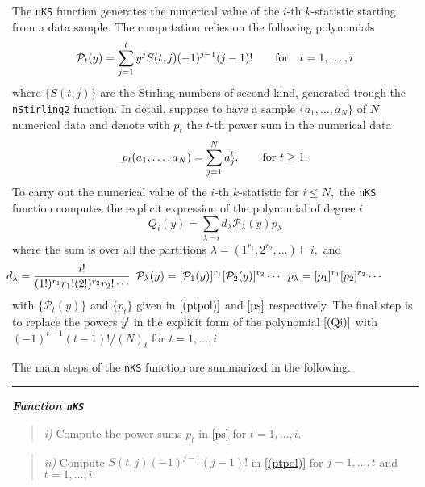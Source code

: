 The \texttt{nKS} function generates the numerical value of the \(i\)-th
\(k\)-statistic starting from a data sample. The computation relies on
the following polynomials \begin{equation}
{\mathcal P}_t(y) = \sum_{j=1}^t y^j S(t,j) (-1)^{j-1} (j-1)! \qquad \hbox{for} \quad t=1, \ldots, i
\label{(ptpol)}
\end{equation} where \(\{S(t,j)\}\) are the Stirling numbers of second
kind, generated trough the \texttt{nStirling2} function. In detail,
suppose to have a sample \(\{a_1, \ldots, a_N\}\) of \(N\) numerical
data and denote with \(p_t\) the \(t\)-th power sum in the numerical
data \begin{equation}
p_t(a_1, \ldots, a_N)  = \sum_{j=1}^N a_j^t, \qquad \hbox{for} \,\,  t\geq 1.
\label{ps}
\end{equation} To carry out the numerical value of the \(i\)-th
\(k\)-statistic for \(i \leq N,\) the \texttt{nKS} function computes the
explicit expression of the polynomial of degree \(i\) \begin{equation}
Q_i(y) = \sum_{\lambda \vdash i} d_{\lambda} {\mathcal P}_{\lambda}(y) p_{\lambda}
\label{(Qi)}
\end{equation} where the sum is over all the partitions
\(\lambda=(1^{r_1},2^{r_2},\ldots) \vdash i,\) and \begin{equation}
\hskip-1.5cm{\small d_{\lambda}=\frac{i!}{(1!)^{r_1} r_1! (2!)^{r_2} r_2! \cdots} \,\,\, {\mathcal P}_{\lambda}(y) =  [{\mathcal P}_{1}(y)]^{r_1} [{\mathcal P}_{2}(y)]^{r_2} \cdots \,\,\, {p}_{\lambda} =  [p_{1}]^{r_1} [p_{2}]^{r_2} \cdots} \!\!\!
\label{dlambda}
\end{equation} with \(\{{\mathcal P}_{t}(y)\}\) and \(\{p_{t}\}\) given
in \(\eqref{(ptpol)}\) and \(\eqref{ps}\) respectively. The final step
is to replace the powers \(y^t\) in the explicit form of the polynomial
\(\eqref{(Qi)}\) with \((-1)^{t-1} (t-1)!/(N)_t\) for \(t=1, \ldots,i.\)

\hskip-0.5cm The main steps of the \texttt{nKS} function are summarized
in the following. \noindent

\rule{13cm}{0.4pt}

\textbf{\emph{Function \texttt{nKS}}}

\begin{quote}
\emph{i)} Compute the power sums \(p_t\) in \eqref{ps} for
\(t=1, \ldots,i.\)
\end{quote}

\begin{quote}
\emph{ii)} Compute \(S(t,j) (-1)^{j-1} (j-1)!\) in \eqref{(ptpol)} for
\(j=1, \ldots,t\) and \(t=1,\ldots,i.\)
\end{quote}

